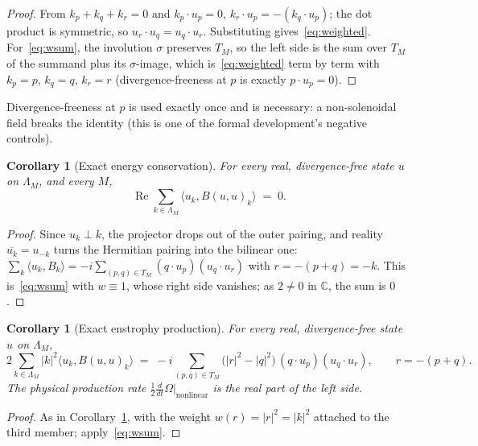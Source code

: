 \documentclass[11pt]{amsart}
\newcommand{\C}{\mathbb{C}}
\newcommand{\Lam}{\Lambda_M}
\theoremstyle{plain}
\newtheorem{corollary}[theorem]{Corollary}
\theoremstyle{definition}
\theoremstyle{remark}
\begin{document}
\begin{proof}
From $k_p + k_q + k_r = 0$ and $k_p \cdot u_p = 0$, $k_r \cdot u_p = -(k_q \cdot u_p)$; the dot
product is symmetric, so $u_r \cdot u_q = u_q \cdot u_r$. Substituting gives~\eqref{eq:weighted}.
For~\eqref{eq:wsum}, the involution $\sigma$ preserves $T_M$, so the left side is the sum over
$T_M$ of the summand plus its $\sigma$-image, which is~\eqref{eq:weighted} term by term with
$k_p = p$, $k_q = q$, $k_r = r$ (divergence-freeness at $p$ is exactly $p \cdot u_p = 0$).
\end{proof}

Divergence-freeness at $p$ is used exactly once and is necessary: a non-solenoidal field breaks
the identity (this is one of the formal development's negative controls).

\begin{corollary}[Exact energy conservation]
\label{cor:energy}
For every real, divergence-free state $u$ on $\Lam$, and every $M$,
\begin{equation}
  \label{eq:energy}
  \operatorname{Re} \sum_{k \in \Lam} \langle u_k, B(u,u)_k\rangle \;=\; 0 .
\end{equation}
\end{corollary}

\begin{proof}
Since $u_k \perp k$, the projector drops out of the outer pairing, and reality
$\overline{u_k} = u_{-k}$ turns the Hermitian pairing into the bilinear one:
$\sum_k \langle u_k, B_k\rangle = -i \sum_{(p,q) \in T_M} (q \cdot u_p)(u_q \cdot u_r)$ with
$r = -(p+q) = -k$. This is~\eqref{eq:wsum} with $w \equiv 1$, whose right side vanishes; as
$2 \ne 0$ in $\C$, the sum is $0$.
\end{proof}

\begin{corollary}[Exact enstrophy production]
\label{cor:enstrophy}
For every real, divergence-free state $u$ on $\Lam$,
\begin{equation}
  \label{eq:enstrophy}
  2 \sum_{k \in \Lam} |k|^2 \langle u_k, B(u,u)_k \rangle
  \;=\; -i \sum_{(p,q) \in T_M} \bigl(|r|^2 - |q|^2\bigr)\,(q \cdot u_p)(u_q \cdot u_r),
  \qquad r = -(p+q).
\end{equation}
The physical production rate $\frac{1}{2}\frac{d}{dt}\Omega\big|_{\text{nonlinear}}$ is the real
part of the left side.
\end{corollary}

\begin{proof}
As in Corollary~\ref{cor:energy}, with the weight $w(r) = |r|^2 = |k|^2$ attached to the third
member; apply~\eqref{eq:wsum}.
\end{proof}
\end{document}
